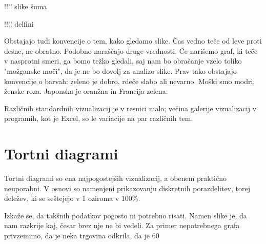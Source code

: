 !!!! slike šuma

!!!! delfini

Obstajajo tudi konvencije o tem, kako gledamo slike. Čas vedno teče od leve proti desne, ne obratno. Podobno naraščajo druge vrednosti. Če narišemo graf, ki teče v nasprotni smeri, ga bomo težko gledali, saj nam bo obračanje vzelo toliko "možganske moči", da je ne bo dovolj za analizo slike. Prav tako obstajajo konvencije o barvah: zeleno je dobro, rdeče slabo ali nevarno. Moški smo modri, ženske roza. Japonska je oranžna in Francija zelena.

Različnih standardnih vizualizacij je v resnici malo; večina galerije vizualizacij v programih, kot je Excel, so le variacije na par različnih tem.

\section{Tortni diagrami}

Tortni diagrami so ena najpogostejših vizualizacij, a obenem praktično neuporabni. V osnovi so namenjeni prikazovanju diskretnih porazdelitev, torej deležev, ki se seštejejo v 1 oziroma v 100\%.

Izkaže se, da takšnih podatkov pogosto ni potrebno risati. Namen slike je, da nam razkrije kaj, česar brez nje ne bi vedeli. Za primer nepotrebnega grafa privzemimo, da je neka trgovina odkrila, da je 60 %

\begin{figure}[H!]
\begin{center}
\end{center}
\end{figure}

